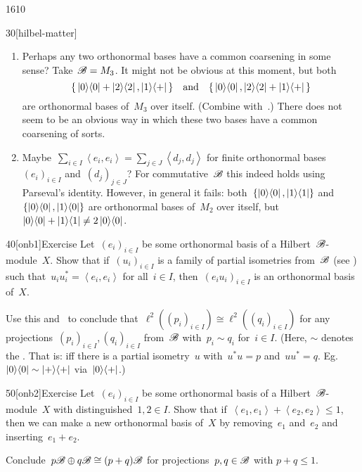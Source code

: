 \begin{parsec}{1610}
\begin{point}{30}[hilbel-matter]
\begin{enumerate}
\item
Perhaps any two orthonormal bases have a common coarsening in some sense?
Take~$\mathscr{B} = M_3$.
It might not be obvious at this moment, but both
\begin{equation*}
    \{\,\left|0\right>\!\left<0\right| + \left|2\right>\!\left<2\right|, \left|1\right>\!\left<+\right|\,\}
    \quad \text{and} \quad
    \{\,\left|0\right>\!\left<0\right|, \left|2\right>\!\left<2\right|+ \left|1\right>\!\left<+\right|\,\}
\end{equation*}
are orthonormal bases of~$M_3$ over itself.
(Combine  with~.)
There does not seem to be an obvious way in which these
    two bases have a common coarsening of sorts.

\item
Maybe~$\sum_{i\in I} \left<e_i,e_i\right> = \sum_{j\in J} \left<d_j,d_j\right>$
    for finite orthonormal bases~$(e_i)_{i \in I}$ and~$(d_j)_{j \in J}$?
For commutative~$\mathscr{B}$ this indeed holds using Parseval's identity.
However, in general it fails:
        both~$\{\left|0\right>\!\left<0\right|, \left|1\right>\!\left<1\right|\}$ and
        $\{\left|0\right>\!\left<0\right|, \left|1\right>\!\left<0\right| \}$
        are orthonormal bases of~$M_2$ over itself,
    but~$\left|0\right>\!\left<0\right|+ \left|1\right>\!\left<1\right| \neq 2 \left|0\right>\!\left<0\right|$.
\end{enumerate}
\end{point}
\begin{point}{40}[onb1]{Exercise}%
Let~$(e_i)_{ i \in I}$ be some orthonormal basis of a Hilbert~$\mathscr{B}$-module~$X$.
Show that if~$(u_i)_{i \in I}$
    is a family of partial isometries
    from~$\mathscr{B}$
    (see )
    such that~$u_iu_i^* = \left<e_i,e_i\right>$
    for all~$i \in I$,
    then~$(e_iu_i)_{i \in I}$
    is an orthonormal basis of~$X$.

Use this and~ to conclude
    that~$\ell^2((p_i)_{i \in I}) \cong \ell^2((q_i)_{i \in I})$
    for any projections~$(p_i)_{i\in I}, (q_i)_{i\in I} $
    from~$\mathscr{B}$
    with~$p_i \sim q_i$ for~$i \in I$.
    (Here, $\sim$ denotes the .
    That is:  iff there is a partial isometry~$u$
    with~$u^*u = p$ and~$uu^*=q$.
    Eg.~$\left|0\right>\!\left<0\right| \sim \left|+\right>\!\left<+\right|$
        via~$\left|0\right>\!\left<+\right|$.)
\end{point}

\begin{point}{50}[onb2]{Exercise}%
Let~$(e_i)_{ i \in I}$ be some orthonormal basis of a Hilbert~$\mathscr{B}$-module~$X$
    with distinguished~$1,2 \in I$.
Show that if~$\left<e_1,e_1\right> + \left<e_2,e_2\right> \leq 1$,
    then we can make a new orthonormal basis of~$X$ by  removing~$e_1$ and~$e_2$
        and inserting~$e_1 + e_2$.

Conclude~$p \mathscr{B} \oplus q \mathscr{B} \cong (p+q) \mathscr{B}$
    for projections~$p,q \in \mathscr{B}$ with $p+q \leq 1$.
\end{point}
\end{parsec}
